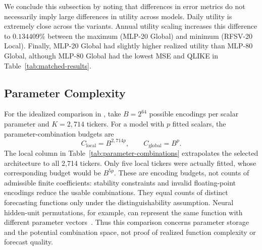 \documentclass[12pt,a4paper]{article}
\numberwithin{equation}{section}
\numberwithin{table}{section}
\numberwithin{figure}{section}
\begin{document}
We conclude this subsection by noting that differences in error metrics do not necessarily imply large differences in utility across models. Daily utility is extremely close across the variants. Annual utility scaling increases this difference to $0.134409\%$ between the maximum (MLP-20 Global) and minimum (RFSV-20 Local). Finally, MLP-20 Global had slightly higher realized utility than MLP-80 Global, although MLP-80 Global had the lowest MSE and QLIKE in Table~\ref{tab:matched-results}.

\subsection{Parameter Complexity}
For the idealized comparison in \cite{monteromanso2021}, take $B=2^{64}$ possible encodings per scalar parameter and $K=2,714$ tickers. For a model with $p$ fitted scalars, the parameter-combination budgets are
\begin{equation}\label{eq:technical-combinations}
C_{\mathrm{local}}=B^{2,714p},\qquad C_{\mathrm{global}}=B^p.
\end{equation}
The local column in Table~\ref{tab:parameter-combinations} extrapolates the selected architecture to all 2,714 tickers. Only five local tickers were actually fitted, whose corresponding budget would be $B^{5p}$. These are encoding budgets, not counts of admissible finite coefficients: stability constraints and invalid floating-point encodings reduce the usable combinations. They equal counts of distinct forecasting functions only under the distinguishability assumption. Neural hidden-unit permutations, for example, can represent the same function with different parameter vectors~\cite{zhou2023}. Thus this comparison concerns parameter storage and the potential combination space, not proof of realized function complexity or forecast quality.
\end{document}
